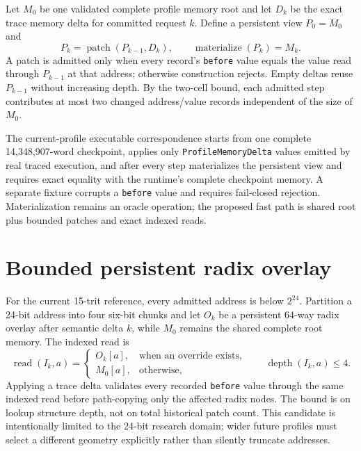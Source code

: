 \documentclass{article}
\begin{document}
Let $M_0$ be one validated complete profile memory root and let $D_k$ be the
exact trace memory delta for committed request $k$. Define a persistent view
$P_0=M_0$ and
\begin{equation}
  P_k = \operatorname{patch}(P_{k-1},D_k),
  \qquad
  \operatorname{materialize}(P_k)=M_k.
  \label{eq:state-graph-persistent-memory}
\end{equation}
A patch is admitted only when every record's \texttt{before} value equals the
value
read
through $P_{k-1}$ at that address; otherwise construction rejects. Empty deltas
reuse $P_{k-1}$ without increasing depth. By the two-cell bound, each admitted
step contributes at most two changed address/value records independent of the
size of $M_0$.

The current-profile executable correspondence starts from one complete
14,348,907-word checkpoint, applies only \texttt{ProfileMemoryDelta} values
emitted by
real traced execution, and after every step materializes the persistent view and
requires exact equality with the runtime's complete checkpoint memory. A
separate fixture corrupts a \texttt{before} value and requires fail-closed
rejection.
Materialization remains an oracle operation; the proposed fast path is shared
root plus bounded patches and exact indexed reads.

\section{Bounded persistent radix overlay}

For the current 15-trit reference, every admitted address is below $2^{24}$.
Partition a 24-bit address into four six-bit chunks and let $O_k$ be a
persistent
64-way radix overlay after semantic delta $k$, while $M_0$ remains the shared
complete root memory. The indexed read is
\begin{equation}
  \operatorname{read}(I_k,a)=
  \begin{cases}
    O_k[a], & \text{when an override exists},\\
    M_0[a], & \text{otherwise},
  \end{cases}
  \qquad \operatorname{depth}(I_k,a)\leq4.
  \label{eq:state-graph-indexed-memory}
\end{equation}
Applying a trace delta validates every recorded \texttt{before} value through
the same
indexed read before path-copying only the affected radix nodes. The bound is on
lookup structure depth, not on total historical patch count. This candidate is
intentionally limited to the 24-bit research domain; wider future profiles must
select a different geometry explicitly rather than silently truncate addresses.
\end{document}
